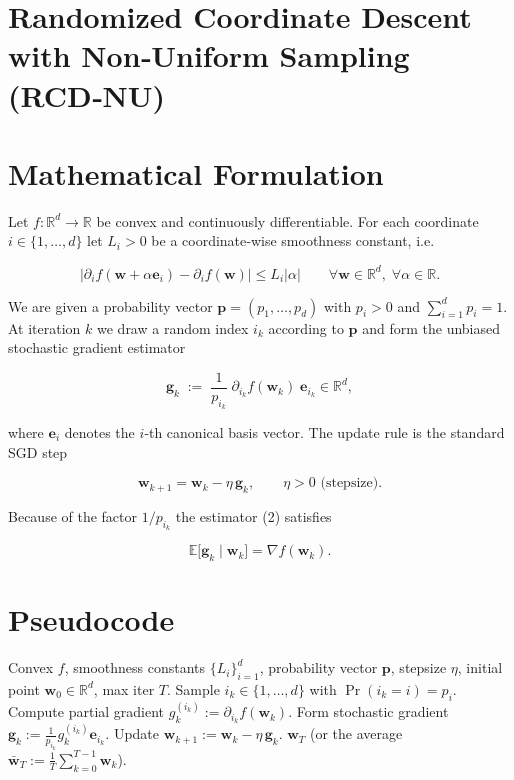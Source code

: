 \documentclass{article}
\newcommand{\E}{\mathbb{E}}
\newcommand{\R}{\mathbb{R}}
\newcommand{\pvec}{\mathbf{p}}
\newcommand{\evec}{\mathbf{e}}
\newcommand{\grad}{\nabla}
\begin{document}
\section*{Randomized Coordinate Descent with Non‑Uniform Sampling (RCD‑NU)}

\section*{Mathematical Formulation}
Let $f:\R^{d}\rightarrow\R$ be convex and continuously differentiable.  
For each coordinate $i\in\{1,\dots,d\}$ let $L_i>0$ be a coordinate‑wise smoothness constant, i.e.

\[
\big| \partial_i f(\mathbf{w}+ \alpha \evec_i)-\partial_i f(\mathbf{w})\big|\le L_i |\alpha|
\qquad\forall \mathbf{w}\in\R^{d},\;\forall \alpha\in\R .
\tag{1}
\]

We are given a probability vector $\pvec=(p_1,\dots,p_d)$ with $p_i>0$ and $\sum_{i=1}^{d}p_i=1$.  
At iteration $k$ we draw a random index $i_k$ according to $\pvec$ and form the unbiased stochastic gradient estimator

\[
\mathbf{g}_k \;:=\; \frac{1}{p_{i_k}}\; \partial_{i_k} f(\mathbf{w}_k)\; \evec_{i_k}\in\R^{d},
\tag{2}
\]

where $\evec_i$ denotes the $i$‑th canonical basis vector.  
The update rule is the standard SGD step

\[
\mathbf{w}_{k+1}= \mathbf{w}_k - \eta\,\mathbf{g}_k ,
\qquad\eta>0 \text{ (stepsize)} .
\tag{3}
\]

Because of the factor $1/p_{i_k}$ the estimator (2) satisfies  

\[
\E\big[\mathbf{g}_k\mid \mathbf{w}_k\big]=\grad f(\mathbf{w}_k) .
\tag{4}
\]

\section*{Pseudocode}
\begin{algorithm}[H]
\caption{RCD‑NU}
\begin{algorithmic}[1]
\Require Convex $f$, smoothness constants $\{L_i\}_{i=1}^d$, probability vector $\pvec$, stepsize $\eta$, initial point $\mathbf{w}_0\in\R^d$, max iter $T$.
    \State Sample $i_k\in\{1,\dots,d\}$ with $\Pr(i_k=i)=p_i$.
    \State Compute partial gradient $g_{k}^{(i_k)}:=\partial_{i_k} f(\mathbf{w}_k)$.
    \State Form stochastic gradient $\mathbf{g}_k:=\frac{1}{p_{i_k}}g_{k}^{(i_k)}\evec_{i_k}$.
    \State Update $\mathbf{w}_{k+1}:=\mathbf{w}_k-\eta\,\mathbf{g}_k$.
\EndFor
\State \Return $\mathbf{w}_T$ (or the average $\bar{\mathbf{w}}_T:=\frac1T\sum_{k=0}^{T-1}\mathbf{w}_k$).
\end{algorithmic}
\end{algorithm}
\end{document}
